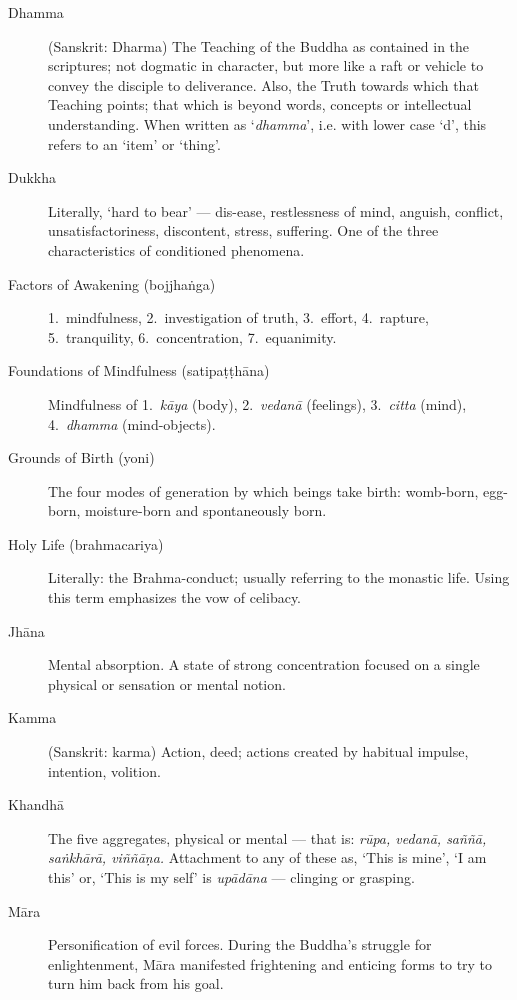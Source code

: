 \begin{description}
\item[Dhamma] (Sanskrit: Dharma) The Teaching of the Buddha as contained
  in the scriptures; not dogmatic in character, but more like a raft or
  vehicle to convey the disciple to deliverance. Also, the Truth towards
  which that Teaching points; that which is beyond words, concepts or
  intellectual understanding. When written as ‘\emph{dhamma}’, i.e.
  with lower case `d', this refers to an ‘item’ or ‘thing’.

\item[Dukkha] Literally, ‘hard to bear’ --- dis-ease, restlessness of
  mind, anguish, conflict, unsatisfactoriness, discontent, stress,
  suffering. One of the three characteristics of conditioned phenomena.

\item[Factors of Awakening (bojjhaṅga)] 1.~mindfulness, 2.~investigation of truth, 3.~effort, 4.~rapture, 5.~tranquility, 6.~concentration, 7.~equanimity.

\item[Foundations of Mindfulness (satipaṭṭhāna)] Mindfulness of 1.~\emph{kāya} (body), 2.~\emph{vedanā} (feelings), 3.~\emph{citta} (mind),
4.~\emph{dhamma} (mind-objects).

\item[Grounds of Birth (yoni)] The four modes of generation by which
  beings take birth: womb-born, egg-born, moisture-born and spontaneously born.

\item[Holy Life (brahmacariya)] Literally: the Brahma-conduct; usually
  referring to the monastic life. Using this term emphasizes the vow of
  celibacy.

\item[Jhāna] Mental absorption. A state of strong concentration focused
  on a single physical or sensation or mental notion.

\item[Kamma] (Sanskrit: karma) Action, deed; actions created by habitual
  impulse, intention, volition.
  
\item[Khandhā] The five aggregates, physical or mental ---
  that is: \emph{rūpa, vedanā, saññā, saṅkhārā, viññāṇa.} Attachment to
  any of these as, ‘This is mine’, ‘I am this’ or, ‘This is my self’ is
  \emph{upādāna} --- clinging or grasping.

\item[Māra] Personification of evil forces. During the Buddha’s struggle
  for enlightenment, Māra manifested frightening and enticing forms to
  try to turn him back from his goal.


\end{description}
